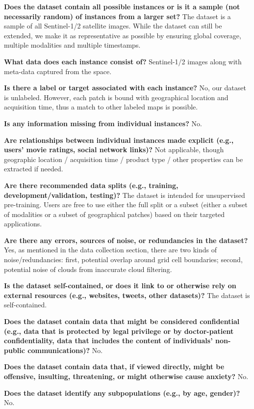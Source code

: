 \documentclass[lettersize,journal]{IEEEtran}
\begin{document}
\textbf{Does the dataset contain all possible instances or is it a sample (not necessarily random) of instances from a larger set?} The dataset is a sample of all Sentinel-1/2 satellite images. While the dataset can still be extended, we make it as representative as possible by ensuring global coverage, multiple modalities and multiple timestamps.

\textbf{What data does each instance consist of?} Sentinel-1/2 images along with meta-data captured from the space.

\textbf{Is there a label or target associated with each instance?} No, our dataset is unlabeled. However, each patch is bound with geographical location and acquisition time, thus a match to other labeled maps is possible.

\textbf{Is any information missing from individual instances?} No.

\textbf{Are relationships between individual instances made explicit (e.g., users’ movie ratings, social
network links)?} Not applicable, though geographic location / acquisition time / product type / other properties can be extracted if needed.

\textbf{Are there recommended data splits (e.g., training, development/validation, testing)?} The dataset is intended for unsupervised pre-training. Users are free to use either the full split or a subset (either a subset of modalities or a subset of geographical patches) based on their targeted applications.

\textbf{Are there any errors, sources of noise, or redundancies in the dataset?} Yes, as mentioned in the data collection section, there are two kinds of noise/redundancies: first, potential overlap around grid cell boundaries; second, potential noise of clouds from inaccurate cloud filtering.

\textbf{Is the dataset self-contained, or does it link to or otherwise rely on external resources (e.g.,
websites, tweets, other datasets)?} The dataset is self-contained.

\textbf{Does the dataset contain data that might be considered confidential (e.g., data that is protected
by legal privilege or by doctor-patient confidentiality, data that includes the content of individuals’ non-public communications)?} No.

\textbf{Does the dataset contain data that, if viewed directly, might be offensive, insulting, threatening,
or might otherwise cause anxiety?} No.

\textbf{Does the dataset identify any subpopulations (e.g., by age, gender)?} No.
\end{document}
